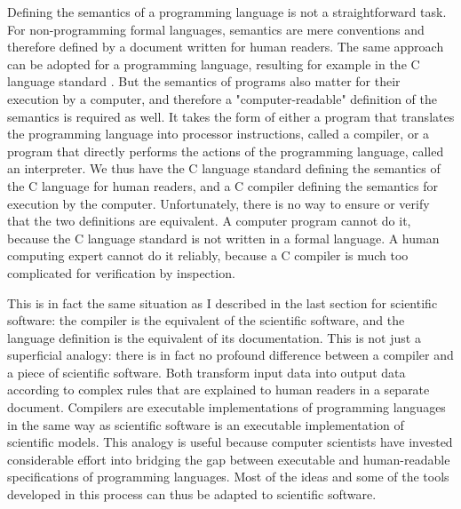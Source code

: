 Defining the semantics of a programming language is not a straightforward task. For non-programming formal languages, semantics are mere conventions and therefore defined by a document written for human readers. The same approach can be adopted for a programming language, resulting for example in the C language standard \cite{_iso/iec_2011}. But the semantics of programs also matter for their execution by a computer, and therefore a "computer-readable" definition of the semantics is required as well. It takes the form of either a program that translates the programming language into processor instructions, called a compiler, or a program that directly performs the actions of the programming language, called an interpreter. We thus have the C language standard defining the semantics of the C language for human readers, and a C compiler defining the semantics for execution by the computer. Unfortunately, there is no way to ensure or verify that the two definitions are equivalent. A computer program cannot do it, because the C language standard is not written in a formal language. A human computing expert cannot do it reliably, because a C compiler is much too complicated for verification by inspection.

This is in fact the same situation as I described in the last section for scientific software: the compiler is the equivalent of the scientific software, and the language definition is the equivalent of its documentation. This is not just a superficial analogy: there is in fact no profound difference between a compiler and a piece of scientific software. Both transform input data into output data according to complex rules that are explained to human readers in a separate document. Compilers are executable implementations of programming languages in the same way as scientific software is an executable implementation of scientific models. This analogy is useful because computer scientists have invested considerable effort into bridging the gap between executable and human-readable specifications of programming languages. Most of the ideas and some of the tools developed in this process can thus be adapted to scientific software.

